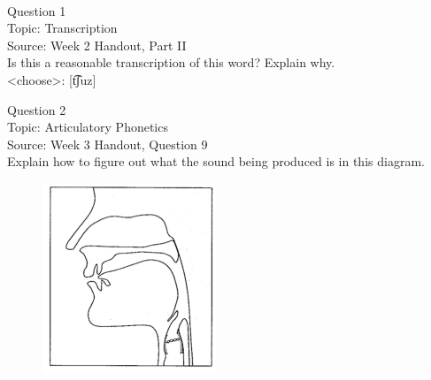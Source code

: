 \documentclass[12pt]{article}
\begin{document}
\newpage

\begin{center}
\textbf{{\color{red}{\HUGE END OF EXAM}}}\\

\end{center}
\newpage

\begin{center}
\textbf{{\color{blue}{\HUGE START OF EXAM\\}}}

\textbf{{\color{blue}{\HUGE Student ID: 86674\\}}}

\textbf{{\color{blue}{\HUGE \\}}}

\end{center}
\newpage

{\large Question 1}\\

Topic: Transcription\\
Source: Week 2 Handout, Part II\\

Is this a reasonable transcription of this word? Explain why.\\

<choose>: {[t͡ʃuz]}


\newpage

{\large Question 2}\\

Topic: Articulatory Phonetics\\
Source: Week 3 Handout, Question 9\\

Explain how to figure out what the sound being produced is in this diagram.\\

\begin{figure}[H]
\includegraphics{../images/sagittal_eth.png}
\end{figure}
\end{document}
